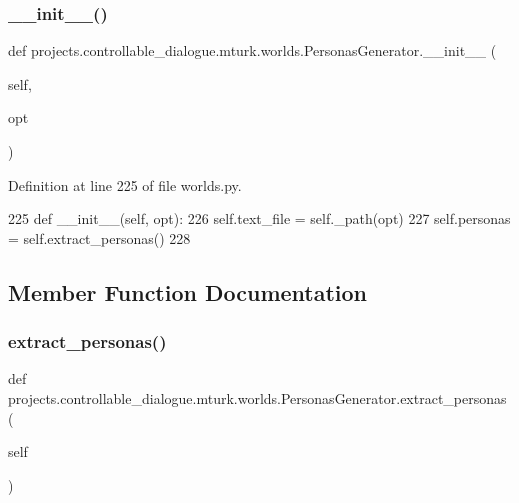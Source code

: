\subsubsection{\texorpdfstring{\+\_\+\+\_\+init\+\_\+\+\_\+()}{\_\_init\_\_()}}
{\footnotesize\ttfamily def projects.\+controllable\+\_\+dialogue.\+mturk.\+worlds.\+Personas\+Generator.\+\_\+\+\_\+init\+\_\+\+\_\+ (\begin{DoxyParamCaption}\item[{}]{self,  }\item[{}]{opt }\end{DoxyParamCaption})}



Definition at line 225 of file worlds.\+py.


\begin{DoxyCode}
225     \textcolor{keyword}{def }\_\_init\_\_(self, opt):
226         self.text\_file = self.\_path(opt)
227         self.personas = self.extract\_personas()
228 
\end{DoxyCode}


\subsection{Member Function Documentation}
\mbox{\label{classprojects_1_1controllable__dialogue_1_1mturk_1_1worlds_1_1PersonasGenerator_aa850e152f50cbd96ea6899a830bdad10}} 
\subsubsection{\texorpdfstring{extract\+\_\+personas()}{extract\_personas()}}
{\footnotesize\ttfamily def projects.\+controllable\+\_\+dialogue.\+mturk.\+worlds.\+Personas\+Generator.\+extract\+\_\+personas (\begin{DoxyParamCaption}\item[{}]{self }\end{DoxyParamCaption})}



